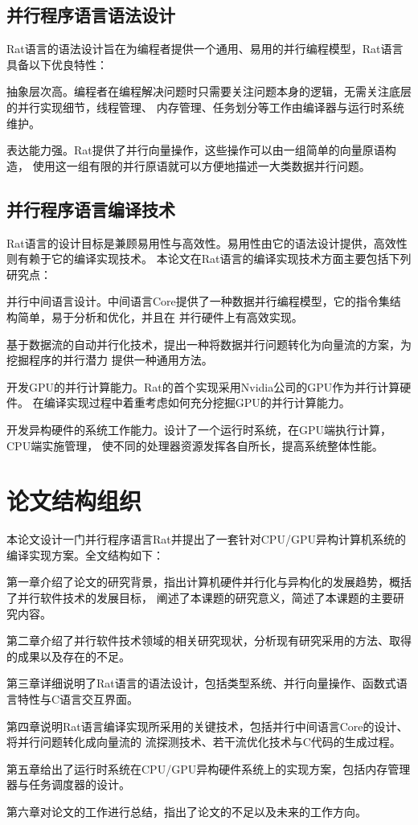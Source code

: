 \subsection{并行程序语言语法设计}
Rat语言的语法设计旨在为编程者提供一个通用、易用的并行编程模型，Rat语言具备以下优良特性：
\begin{compactitem}
  \item 抽象层次高。编程者在编程解决问题时只需要关注问题本身的逻辑，无需关注底层的并行实现细节，线程管理、
    内存管理、任务划分等工作由编译器与运行时系统维护。
  \item 表达能力强。Rat提供了并行向量操作，这些操作可以由一组简单的向量原语构造，
    使用这一组有限的并行原语就可以方便地描述一大类数据并行问题。
\end{compactitem}

\subsection{并行程序语言编译技术}
Rat语言的设计目标是兼顾易用性与高效性。易用性由它的语法设计提供，高效性则有赖于它的编译实现技术。
本论文在Rat语言的编译实现技术方面主要包括下列研究点：
\begin{compactitem}
  \item 并行中间语言设计。中间语言Core提供了一种数据并行编程模型，它的指令集结构简单，易于分析和优化，并且在
    并行硬件上有高效实现。
  \item 基于数据流的自动并行化技术，提出一种将数据并行问题转化为向量流的方案，为挖掘程序的并行潜力
    提供一种通用方法。
  \item 开发GPU的并行计算能力。Rat的首个实现采用Nvidia公司的GPU作为并行计算硬件。
    在编译实现过程中着重考虑如何充分挖掘GPU的并行计算能力。
  \item 开发异构硬件的系统工作能力。设计了一个运行时系统，在GPU端执行计算，CPU端实施管理，
    使不同的处理器资源发挥各自所长，提高系统整体性能。
\end{compactitem}

\section{论文结构组织}
本论文设计一门并行程序语言Rat并提出了一套针对CPU/GPU异构计算机系统的编译实现方案。全文结构如下：

第一章介绍了论文的研究背景，指出计算机硬件并行化与异构化的发展趋势，概括了并行软件技术的发展目标，
阐述了本课题的研究意义，简述了本课题的主要研究内容。

第二章介绍了并行软件技术领域的相关研究现状，分析现有研究采用的方法、取得的成果以及存在的不足。

第三章详细说明了Rat语言的语法设计，包括类型系统、并行向量操作、函数式语言特性与C语言交互界面。

第四章说明Rat语言编译实现所采用的关键技术，包括并行中间语言Core的设计、将并行问题转化成向量流的
流探测技术、若干流优化技术与C代码的生成过程。

第五章给出了运行时系统在CPU/GPU异构硬件系统上的实现方案，包括内存管理器与任务调度器的设计。

第六章对论文的工作进行总结，指出了论文的不足以及未来的工作方向。

